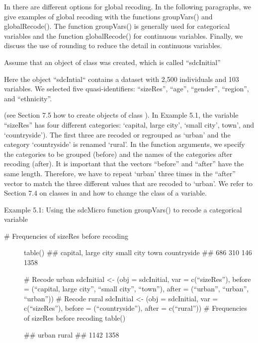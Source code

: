 \documentclass[letterpaper,10pt,english]{sphinxmanual}
\begin{document}
In  there are different options for global recoding. In the
following paragraphs, we give examples of global recoding with the
functions groupVars() and globalRecode(). The function groupVars() is
generally used for categorical variables and the function globalRecode()
for continuous variables. Finally, we discuss the use of rounding to
reduce the detail in continuous variables.


Assume that an object of class  was created, which is called
“sdcInitial” %
\begin{footnote}[2]\sphinxAtStartFootnote
Here the  object “sdcIntial“ contains a dataset with 2,500
individuals and 103 variables. We selected five quasi-identifiers:
“sizeRes”, “age”, “gender”, “region”, and “ethnicity”.
%
\end{footnote} (see Section 7.5 how to create
objects of class ). In Example 5.1, the variable “sizeRes” has
four different categories: ‘capital, large city’, ‘small city’, town’,
and ‘countryside’). The first three are recoded or regrouped as ‘urban’
and the category ‘countryside’ is renamed ‘rural’. In the function
arguments, we specify the categories to be grouped (before) and the
names of the categories after recoding (after). It is important that the
vectors “before” and “after” have the same length. Therefore, we have to
repeat ‘urban’ three times in the “after” vector to match the three
different values that are recoded to ‘urban’.  We refer to
Section 7.4 on classes in  and how to change the class of a variable.

Example 5.1: Using the sdcMicro function groupVars() to recode a
categorical variable
\begin{description}
\item[{\# Frequencies of sizeRes before recoding}] \leavevmode
table()
\#\# capital, large city          small city             town       countryside
\#\#                 686                 310              146              1358

\# Recode urban
sdcInitial \textless{}- (obj = sdcInitial, var =
c(“sizeRes”), before = (“capital, large city”, “small city”, “town”), after = (“urban”, “urban”, “urban”))
\# Recode rural
sdcInitial \textless{}- (obj = sdcInitial, var =
c(“sizeRes”), before = (“countryside”), after = c(“rural”))
\# Frequencies of sizeRes before recoding
table()

\#\# urban rural
\#\#  1142  1358

\end{description}
\end{document}
